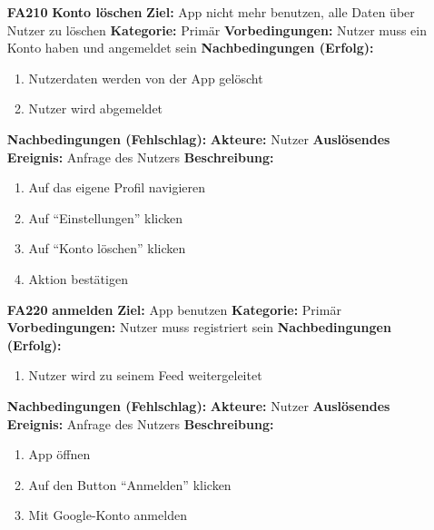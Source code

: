 \documentclass[parskip=full]{scrartcl}
\begin{document}
\begin{itemize}[nosep]
			\item[\textbf{FA210}]\textbf{Konto löschen}
							\newline \textbf{Ziel:} App nicht mehr benutzen, alle Daten über Nutzer zu löschen
							\newline \textbf{Kategorie:} Primär
							\newline \textbf{Vorbedingungen:} Nutzer muss ein Konto haben und angemeldet sein
							\newline \textbf{Nachbedingungen (Erfolg):} 
							\begin{enumerate}[nosep]
								\item Nutzerdaten werden von der App gelöscht
								\item Nutzer wird abgemeldet 
							\end{enumerate}
							\textbf{Nachbedingungen (Fehlschlag):}
							\newline \textbf{Akteure:} Nutzer
							\newline \textbf{Auslösendes Ereignis:} Anfrage des Nutzers
							\newline \textbf{Beschreibung:}
							\begin{enumerate}[nosep]
								\item Auf das eigene Profil navigieren
								\item Auf “Einstellungen” klicken
								\item Auf “Konto löschen” klicken
								\item Aktion bestätigen\\
							\end{enumerate}
			
			\item[\textbf{FA220}]\textbf{anmelden}
							\newline \textbf{Ziel:} App benutzen
							\newline \textbf{Kategorie:} Primär
							\newline \textbf{Vorbedingungen:} Nutzer muss registriert sein
							\newline \textbf{Nachbedingungen (Erfolg):} 
							\begin{enumerate}[nosep]
								\item Nutzer wird zu seinem \gls{Feed} weitergeleitet 
							\end{enumerate}
							\textbf{Nachbedingungen (Fehlschlag):}
							\newline \textbf{Akteure:} Nutzer
							\newline \textbf{Auslösendes Ereignis:} Anfrage des Nutzers
							\newline \textbf{Beschreibung:}
							\begin{enumerate}[nosep]
								\item App öffnen
								\item Auf den Button “Anmelden” klicken
								\item Mit Google-Konto anmelden\\
							\end{enumerate}
						

\end{itemize}
\end{document}
